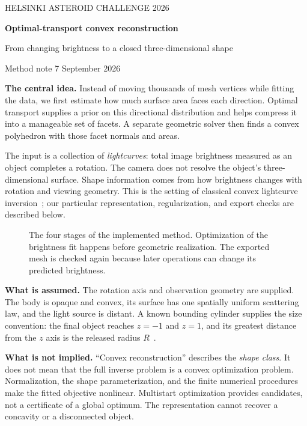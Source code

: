 \documentclass[11pt,a4paper]{article}
\begin{document}
\thispagestyle{empty}
{\color{accent}\small HELSINKI ASTEROID CHALLENGE 2026}\par
\vspace{5pt}
{\LARGE\bfseries Optimal-transport convex reconstruction}\par
\vspace{3pt}
{\large From changing brightness to a closed three-dimensional shape}\par
\vspace{5pt}
{\small Method note \hfill 7 September 2026}
\vspace{12pt}

\textbf{The central idea.} Instead of moving thousands of mesh vertices while fitting the data, we first estimate how much surface area faces each direction. Optimal transport supplies a prior on this directional distribution and helps compress it into a manageable set of facets. A separate geometric solver then finds a convex polyhedron with those facet normals and areas.

The input is a collection of \emph{lightcurves}: total image brightness measured as an object completes a rotation. The camera does not resolve the object's three-dimensional surface. Shape information comes from how brightness changes with rotation and viewing geometry. This is the setting of classical convex lightcurve inversion~\cite{kaasalainen2001}; our particular representation, regularization, and export checks are described below.

\begin{figure}[h]
\centering\resizebox{\linewidth}{!}{}
\caption{The four stages of the implemented method. Optimization of the brightness fit happens before geometric realization. The exported mesh is checked again because later operations can change its predicted brightness.}
\end{figure}

\textbf{What is assumed.} The rotation axis and observation geometry are supplied. The body is opaque and convex, its surface has one spatially uniform scattering law, and the light source is distant. A known bounding cylinder supplies the size convention: the final object reaches $z=-1$ and $z=1$, and its greatest distance from the $z$ axis is the released radius $R$~\cite{hac2026}.

\textbf{What is not implied.} ``Convex reconstruction'' describes the \emph{shape class}. It does not mean that the full inverse problem is a convex optimization problem. Normalization, the shape parameterization, and the finite numerical procedures make the fitted objective nonlinear. Multistart optimization provides candidates, not a certificate of a global optimum. The representation cannot recover a concavity or a disconnected object.
\end{document}

